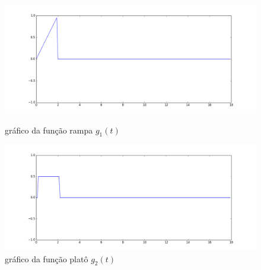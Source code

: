 \documentclass[12pt]{article}
\begin{document}
\begin{figure}[!h]
	\centering
	\begin{minipage}[b]{0.49\linewidth}
		\includegraphics[width=1.15\linewidth]{g1.png}
		\caption{gráfico da função rampa $g_1(t)$}
	\end{minipage}
	\hfill
	\begin{minipage}[b]{0.49\linewidth}
		\includegraphics[width=1.15\linewidth]{g2.png}
		\caption{gráfico da função platô $g_2(t)$}
	\end{minipage}
	\vspace{1cm}
	

\end{figure}
\end{document}

